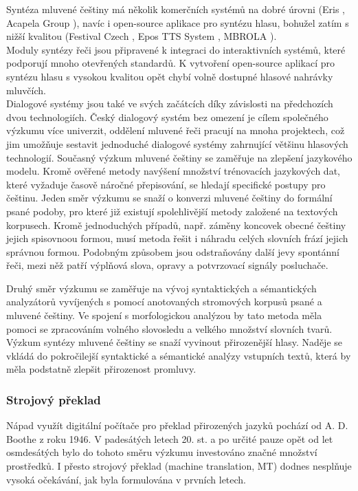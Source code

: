 \begin{multicols}{2}
Syntéza mluvené češtiny má několik komerčních systémů na dobré úrovni (Eris \cite{Note11}, Acapela Group \cite{Note14}), navíc i open-source aplikace pro syntézu hlasu, bohužel zatím s nižší kvalitou (Festival Czech \cite{Note15}, Epos TTS System \cite{Note16}, MBROLA \cite{Note17}).\\
Moduly syntézy řeči jsou připravené k integraci do interaktivních systémů, které podporují mnoho otevřených standardů. K vytvoření open-source aplikací pro syntézu hlasu s vysokou kvalitou opět chybí volně dostupné hlasové nahrávky mluvčích.\\
Dialogové systémy jsou také ve svých začátcích díky závislosti na předchozích dvou technologiích. Český dialogový systém bez omezení je cílem společného výzkumu více univerzit, oddělení mluvené řeči pracují na mnoha projektech, což jim umožňuje sestavit jednoduché dialogové systémy zahrnující většinu hlasových technologií. Současný výzkum mluvené češtiny se zaměřuje na zlepšení jazykového modelu.  Kromě ověřené metody navýšení množství trénovacích jazykových dat, které vyžaduje časově náročné přepisování, se hledají specifické postupy pro češtinu. Jeden směr výzkumu se snaží o konverzi mluvené češtiny do formální psané podoby, pro které již existují spolehlivější metody založené na textových korpusech. Kromě jednoduchých případů, např. záměny koncovek obecné češtiny jejich spisovnoou formou, musí metoda řešit i náhradu celých slovních frází jejich správnou formou. Podobným způsobem jsou odstraňovány další jevy spontánní řeči, mezi něž patří výplňová slova, opravy a potvrzovací signály posluchače.

Druhý směr výzkumu se zaměřuje na vývoj syntaktických a sémantických analyzátorů vyvíjených s pomocí anotovaných stromových korpusů psané a mluvené češtiny.  Ve spojení s morfologickou analýzou by tato metoda měla pomoci se zpracováním volného slovosledu a velkého množství slovních tvarů.\\
Výzkum syntézy mluvené češtiny se snaží vyvinout přirozenější hlasy. Naděje se vkládá do pokročilejší syntaktické a sémantické analýzy vstupních textů, která by měla podstatně zlepšit přirozenost promluvy.

\subsubsection{Strojový překlad}

Nápad využít digitální počítače pro překlad přirozených jazyků pochází od A. D. Boothe z roku 1946. V padesátých letech 20. st. a po určité pauze opět od let osmdesátých bylo do tohoto směru výzkumu investováno značné množství prostředků. I přesto strojový překlad (machine translation, MT) dodnes nesplňuje vysoká očekávání, jak byla formulována v prvních letech.


\end{multicols}
